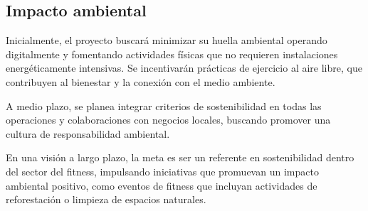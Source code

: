 \color{red}

\subsection{Impacto ambiental}

Inicialmente, el proyecto buscará minimizar su huella ambiental operando digitalmente y fomentando actividades físicas que no requieren instalaciones energéticamente intensivas. Se incentivarán prácticas de ejercicio al aire libre, que contribuyen al bienestar y la conexión con el medio ambiente.

A medio plazo, se planea integrar criterios de sostenibilidad en todas las operaciones y colaboraciones con negocios locales, buscando promover una cultura de responsabilidad ambiental.

En una visión a largo plazo, la meta es ser un referente en sostenibilidad dentro del sector del fitness, impulsando iniciativas que promuevan un impacto ambiental positivo, como eventos de fitness que incluyan actividades de reforestación o limpieza de espacios naturales.